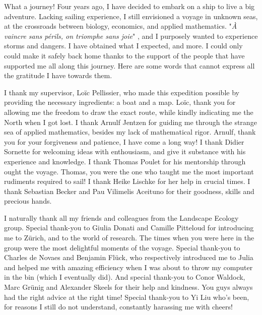 %
\label{sec:acknowledgement}


What a journey!
% 
Four years ago, I have decided to embark on a ship to live a big adventure.
% 
Lacking sailing experience, I still envisioned a voyage in unknown seas, at the crossroads between biology, economics, and applied mathematics.
% 
"\textit{À vaincre sans périls, on triomphe sans joie}" \citep{maufrais1997aventures}, and I purposely wanted to experience storms and dangers.
% 
I have obtained what I expected, and more.
% 
I could only could make it safely back home thanks to the support of the people that have supported me all along this journey. Here are some words that cannot express all the gratitude I have towards them.

I thank my supervisor, Loïc Pellissier, who made this expedition possible by providing the necessary ingredients: a boat and a map. Loïc, thank you for allowing me the freedom to draw the exact route, while kindly indicating me the North when I got lost.
% 
I thank Arnulf Jentzen for guiding me through the strange sea of applied mathematics, besides my lack of mathematical rigor. Arnulf, thank you for your forgiveness and patience, I have come a long way!
% 
I thank Didier Sornette for welcoming ideas with enthousiasm, and give it substance with his experience and knowledge.
% 
I thank Thomas Poulet for his mentorship through ought the voyage. Thomas, you were the one who taught me the most important rudiments required to sail! 
% 
I thank Heike Lischke for her help in crucial times.
% 
I thank Sebastian Becker and Pau Vilimelis Aceituno for their goodness, skills and precious hands.
% 

% 
I naturally thank all my friends and colleagues from the Landscape Ecology group. Special thank-you to Giulia Donati and Camille Pitteloud for introducing me to Zürich, and to the world of research. The times when you were here in the group were the most delightful moments of the voyage.
% 
Special thank-you to Charles de Novaes and Benjamin Flück, who respectively introduced me to Julia and helped me with amazing efficiency when I was about to throw my computer in the bin (which I eventually did).
% 
And special thank-you to Conor Waldock, Marc Grünig and Alexander Skeels for their help and kindness. You guys always had the right advice at the right time!
% 
Special thank-you to Yi Liu who's been, for reasons I still do not understand, constantly harassing me with cheers! 

